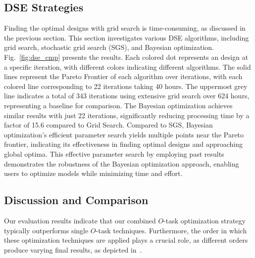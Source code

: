 \subsection{DSE Strategies}
\label{sec:explore_dse}

Finding the optimal designs with grid search is time-consuming, as discussed in the previous section. This section investigates various DSE algorithms, including grid search, stochastic grid search (SGS), and Bayesian optimization. Fig.~\ref{fig:dse_cmp} presents the results. 
Each colored dot represents an design at a specific iteration, with different colors indicating different algorithms. The solid lines represent the Pareto Frontier of each algorithm over iterations, with each colored line corresponding to 22 iterations taking 40 hours. The uppermost grey line indicates a total of 343 iterations using extensive grid search over 624 hours, representing a baseline for comparison. 
The Bayesian optimization achieves similar results with just 22 iterations, significantly reducing processing time by a factor of 15.6 compared to Grid Search. Compared to SGS, Bayesian optimization's efficient parameter search yields multiple points near the Pareto frontier, indicating its effectiveness in finding optimal designs and approaching global optima. This effective parameter search by employing past results demonstrates the robustness of the Bayesian optimization approach, enabling users to optimize models while minimizing time and effort.


%


\subsection{Discussion and Comparison}\label{sec:discussion}



Our evaluation results indicate that our combined $O$-task optimization strategy typically outperforms  single $O$-task techniques. Furthermore, the order in which these optimization techniques are applied plays a crucial role, as different orders produce varying final results, as depicted in~.


